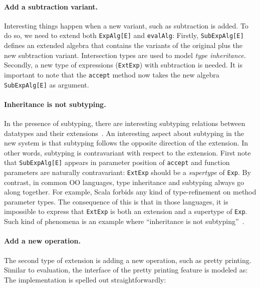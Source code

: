 \paragraph{Add a subtraction variant.} Interesting things happen when a new
variant, such as subtraction is added. To do so, we need to extend both
\lstinline{ExpAlg[E]} and \lstinline{evalAlg}:
Firstly, \lstinline{SubExpAlg[E]} defines an extended algebra that contains the
variants of the original plus the new subtraction variant. Intersection types
are used to model \textit{type inheritance}. Secondly, a new type of expressions
(\lstinline{ExtExp}) with subtraction is needed. It is important to note that
the \lstinline{accept} method now takes the new algebra \lstinline{SubExpAlg[E]}
as argument.

\paragraph{Inheritance is not subtyping.} In the presence of subtyping, there
are interesting subtyping relations between datatypes and their
extensions~\cite{oliveira09modular}. An interesting aspect about subtyping in
the new system is that subtyping follows the opposite direction of the
extension. In other words, subtyping is contravariant with respect to the
extension. First note that \lstinline{SubExpAlg[E]} appears in parameter
position of \lstinline{accept} and function parameters are naturally
contravariant: \lstinline{ExtExp} should be a \textit{supertype} of
\lstinline{Exp}. By contrast, in common OO languages, type inheritance and
subtyping always go along together. For example, Scala forbids any kind of
type-refinement on method parameter types. The consequence of this is that in
those languages, it is impossible to express that \lstinline{ExtExp} is both an
extension and a supertype of \lstinline{Exp}. Such kind of phenomena is an
example where ``inheritance is not subtyping''~\cite{cook1989inheritance}.

\paragraph{Add a new operation.} The second type of extension is adding a new
operation, such as pretty printing. Similar to evaluation, the interface of the
pretty printing feature is modeled as:
The implementation is spelled out straightforwardly:


